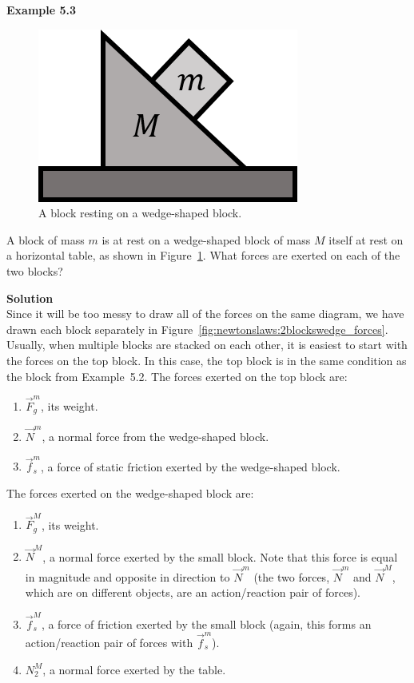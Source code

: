 \begin{framed}
\textbf{Example 5.3}\\
\begin{figure}[!htbp]
\centering
\includegraphics[width=0.2\linewidth]{files/2blockswedge-cc05d5d048b82edd0d9d05a6f393ea62.png}
\caption[]{A block resting on a wedge-shaped block.}
\label{fig:newtonslaws:2blockswedge}
\end{figure}

A block of mass $m$ is at rest on a wedge-shaped block of mass $M$ itself at rest on a horizontal table, as shown in Figure~\ref{fig:newtonslaws:2blockswedge}. What forces are exerted on each of the two blocks?

\begin{framed}
\textbf{Solution}\\
Since it will be too messy to draw all of the forces on the same diagram, we have drawn each block separately in Figure~\ref{fig:newtonslaws:2blockswedge_forces}.
Usually, when multiple blocks are stacked on each other, it is easiest to start with the forces on the top block. In this case, the top block is in the same condition as the block from Example~5.2. The forces exerted on the top block are:

\begin{enumerate}
\item $\vec F_g^m$, its weight.
\item $\vec N^m$, a normal force from the wedge-shaped block.
\item $\vec f_s^m$, a force of static friction exerted by the wedge-shaped block.
\end{enumerate}

The forces exerted on the wedge-shaped block are:

\begin{enumerate}
\item $\vec F_g^M$, its weight.
\item $\vec N^M$, a normal force exerted by the small block. Note that this force is equal in magnitude and opposite in direction to $\vec N^m$ (the two forces, $\vec N^m$ and $\vec N^M$, which are on different objects, are an action/reaction pair of forces).
\item $\vec f_s^M$, a force of friction exerted by the small block (again, this forms an action/reaction pair of forces with  $\vec f_s^m$).
\item $N_2^M$, a normal force exerted by the table.
\end{enumerate}


\end{framed}
\end{framed}
